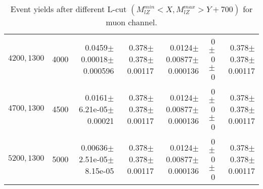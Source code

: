 \documentclass[]{article}
\begin{document}
\begin{table}
\begin{center}
{\begin{tabular}{ |r|r|r|r|r|r|r|}
$4200,1300$ & 4000 & 0.0459$\pm$0.00018$\pm$0.000596 & 0.378$\pm$0.378$\pm$0.00117 & 0.0124$\pm$0.00877$\pm$0.000136 & 0$\pm$0$\pm$0 & 0.378$\pm$0.378$\pm$0.00117 \\
$4700,1300$ & 4500 & 0.0161$\pm$6.21e-05$\pm$0.00021 & 0.378$\pm$0.378$\pm$0.00117 & 0.0124$\pm$0.00877$\pm$0.000136 & 0$\pm$0$\pm$0 & 0.378$\pm$0.378$\pm$0.00117 \\
$5200,1300$ & 5000 & 0.00636$\pm$2.51e-05$\pm$8.15e-05 & 0.378$\pm$0.378$\pm$0.00117 & 0.0124$\pm$0.00877$\pm$0.000136 & 0$\pm$0$\pm$0 & 0.378$\pm$0.378$\pm$0.00117 \\
\hline 
\end{tabular}
}
\end{center}
\caption{Event yields after different L-cut $(M_{lZ}^{min} < X, M_{lZ}^{max} > Y + 700)$ for muon channel.}
\end{table}
\end{document}
